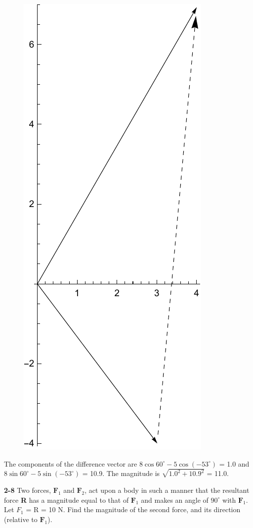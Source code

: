 \documentclass{amsart}
\begin{document}
\begin{figure}[h]
\includegraphics[scale=0.4]{2-7b}
\end{figure}

The components of the difference vector are $8 \cos 60^\circ - 5 \cos (-53^\circ)$ = 1.0 and
$8 \sin 60^\circ - 5 \sin (-53^\circ)$ = 10.9.
The magnitude is $\sqrt{1.0^2 + 10.9^2}$ = 11.0.

\vspace{\baselineskip}
\noindent
\textbf{2-8} Two forces, $\textbf{F}_1$ and $\textbf{F}_2$, act upon a body in such a manner
that the resultant force \textbf{R} has a magnitude equal to that of $\textbf{F}_1$ and
makes an angle of $90^\circ$ with $\textbf{F}_1$.
Let $F_1$ = R = 10 N.  Find  the magnitude of the second force, and its direction
(relative to $\textbf{F}_1$).
\end{document}
